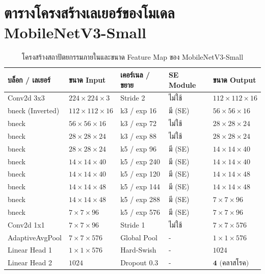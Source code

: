 \section{ตารางโครงสร้างเลเยอร์ของโมเดล MobileNetV3-Small}

\begin{table}[H]
\caption{โครงสร้างสถาปัตยกรรมภายในและขนาด Feature Map ของ MobileNetV3-Small}
\label{tab:app_b_layers}
\begin{tabularx}{\textwidth}{L{2.8cm}C{1.8cm}C{1.8cm}C{1.6cm}Z}
\toprule
\textbf{บล็อก / เลเยอร์} & \textbf{ขนาด Input} & \textbf{เคอร์เนล / ขยาย} & \textbf{SE Module} & \textbf{ขนาด Output} \\
\midrule
Conv2d 3x3 & $224 \times 224 \times 3$ & Stride 2 & ไม่ใช้ & $112 \times 112 \times 16$ \\
bneck (Inverted) & $112 \times 112 \times 16$ & k3 / exp 16 & มี (SE) & $56 \times 56 \times 16$ \\
bneck & $56 \times 56 \times 16$ & k3 / exp 72 & ไม่ใช้ & $28 \times 28 \times 24$ \\
bneck & $28 \times 28 \times 24$ & k3 / exp 88 & ไม่ใช้ & $28 \times 28 \times 24$ \\
bneck & $28 \times 28 \times 24$ & k5 / exp 96 & มี (SE) & $14 \times 14 \times 40$ \\
bneck & $14 \times 14 \times 40$ & k5 / exp 240 & มี (SE) & $14 \times 14 \times 40$ \\
bneck & $14 \times 14 \times 40$ & k5 / exp 120 & มี (SE) & $14 \times 14 \times 48$ \\
bneck & $14 \times 14 \times 48$ & k5 / exp 144 & มี (SE) & $14 \times 14 \times 48$ \\
bneck & $14 \times 14 \times 48$ & k5 / exp 288 & มี (SE) & $7 \times 7 \times 96$ \\
bneck & $7 \times 7 \times 96$ & k5 / exp 576 & มี (SE) & $7 \times 7 \times 96$ \\
Conv2d 1x1 & $7 \times 7 \times 96$ & Stride 1 & ไม่ใช้ & $7 \times 7 \times 576$ \\
AdaptiveAvgPool & $7 \times 7 \times 576$ & Global Pool & - & $1 \times 1 \times 576$ \\
Linear Head 1 & $1 \times 1 \times 576$ & Hard-Swish & - & $1024$ \\
Linear Head 2 & $1024$ & Dropout 0.3 & - & $\mathbf{4} \text{ (คลาสโรค)}$ \\
\bottomrule
\end{tabularx}
\end{table}
